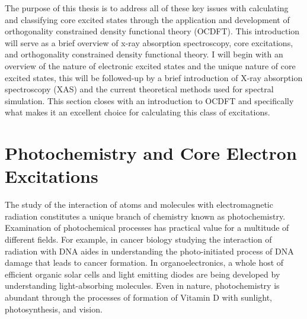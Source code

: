 \documentclass[final]{emory}
\begin{document}
The purpose of this thesis is to address all of these key issues with calculating and classifying core excited states through the application and development of orthogonality constrained density functional theory (OCDFT). This introduction will serve as a brief overview of x-ray absorption spectroscopy, core excitations, and orthogonality constrained density functional theory. I will begin with an overview of the nature of electronic excited states and the unique nature of core excited states, this will be followed-up by a brief introduction of X-ray absorption spectroscopy (XAS) and the current theoretical methods used for spectral simulation. This section closes with an introduction to OCDFT and specifically what makes it an excellent choice for calculating this class of excitations. 
 
\section{Photochemistry and Core Electron Excitations}
The study of the interaction of atoms and molecules with electromagnetic radiation constitutes a unique branch of chemistry known as photochemistry. Examination of photochemical processes has practical value for a multitude of different fields. For example, in cancer biology studying the interaction of radiation with DNA aides in understanding the photo-initiated process of DNA damage that leads to cancer formation. \cite{} In organoelectronics, a whole host of efficient organic solar cells and light emitting diodes are being developed by understanding light-absorbing molecules. Even in nature, photochemistry is abundant through the processes of formation of Vitamin D with sunlight,\cite{holick_vitamin_2003} photosynthesis,\cite{krause_chlorophyll_1991} and vision. \cite{de_vries_quantum_1943}
\end{document}
